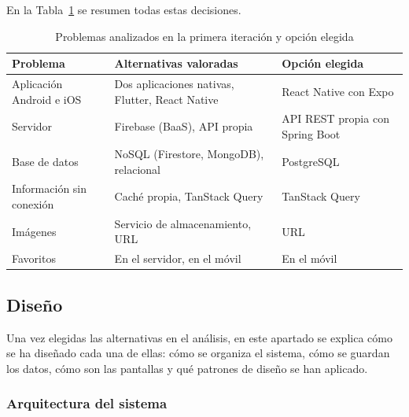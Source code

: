 En la Tabla~\ref{tab:alternativasIt1} se resumen todas estas decisiones.

\begin{table}[H]
\centering
\small
\begin{tabular}{|p{3.6cm}|p{5.6cm}|p{4.4cm}|}
\hline
\textbf{Problema} & \textbf{Alternativas valoradas} & \textbf{Opción elegida} \\
\hline
Aplicación Android e iOS & Dos aplicaciones nativas, Flutter, React Native & React Native con Expo \\
\hline
Servidor & Firebase (BaaS), API propia & API REST propia con Spring Boot \\
\hline
Base de datos & NoSQL (Firestore, MongoDB), relacional & PostgreSQL \\
\hline
Información sin conexión & Caché propia, TanStack Query & TanStack Query \\
\hline
Imágenes & Servicio de almacenamiento, URL & URL \\
\hline
Favoritos & En el servidor, en el móvil & En el móvil \\
\hline
\end{tabular}
\caption{Problemas analizados en la primera iteración y opción elegida}
\label{tab:alternativasIt1}
\end{table}

\subsection{Diseño}

Una vez elegidas las alternativas en el análisis, en este apartado se explica cómo se ha diseñado cada una de ellas: cómo se organiza el sistema, cómo se guardan los datos, cómo son las pantallas y qué patrones de diseño se han aplicado. 

\subsubsection{Arquitectura del sistema}

